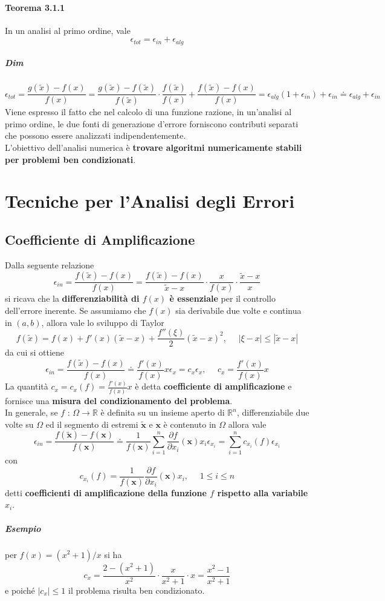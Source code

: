 \documentclass[10pt]{book}
\begin{document}
\paragraph{Teorema 3.1.1} In un analisi al primo ordine, vale $$\epsilon_{tot} = \epsilon_{in} + \epsilon_{alg}$$
\subparagraph{Dim} $$\epsilon_{tot} = \frac{g(\tilde{x}) - f(x)}{f(x)} = \frac{g(\tilde{x}) - f(\tilde{x})}{f(\tilde{x})}\cdot\frac{f(\tilde{x})}{f(x)} + \frac{f(\tilde{x}) - f(x)}{f(x)} = \epsilon_{alg}(1 + \epsilon_{in}) + \epsilon_{in} \doteq \epsilon_{alg} + \epsilon_{in}$$
Viene espresso il fatto che nel calcolo di una funzione razione, in un'analisi al primo ordine, le due fonti di generazione d'errore forniscono contributi separati che possono essere analizzati indipendentemente.\\
L'obiettivo dell'analisi numerica è \textbf{trovare algoritmi numericamente stabili per problemi ben condizionati}.
\section{Tecniche per l'Analisi degli Errori}
\subsection{Coefficiente di Amplificazione}
Dalla seguente relazione $$\epsilon_{in} = \frac{f(\tilde{x}) - f(x)}{f(x)} = \frac{f(\tilde{x}) - f(x)}{\tilde{x} - x}\cdot\frac{x}{f(x)}\cdot\frac{\tilde{x} - x}{x}$$ si ricava che la \textbf{differenziabilità di $f(x)$ è essenziale} per il controllo dell'errore inerente. Se assumiamo che $f(x)$ sia derivabile due volte e continua in $(a, b)$, allora vale lo sviluppo di Taylor $$f(\tilde{x}) = f(x) + f'(x)(\tilde{x} - x) + \frac{f''(\xi)}{2}(\tilde{x} - x)^2,\:\:\:\:\:\:|\xi - x| \leq |\tilde{x} - x| $$ da cui si ottiene $$ \epsilon_{in} = \frac{f(\tilde{x}) - f(x)}{f(x)} \doteq \frac{f'(x)}{f(x)}x\epsilon_x = c_x\epsilon_x,\:\:\:\:\:\:c_x = \frac{f'(x)}{f(x)}x $$
La quantità $c_x = c_x(f) = \frac{f'(x)}{f(x)}x$ è detta \textbf{coefficiente di amplificazione} e fornisce una \textbf{misura del condizionamento del problema}.\\
In generale, se $f$ : $\Omega \rightarrow \mathbb{R}$ è definita su un insieme aperto di $\mathbb{R}^n$, differenziabile due volte su $\Omega$ ed il segmento di estremi $\tilde{\textbf{x}}$ e $\textbf{x}$ è contenuto in $\Omega$ allora vale
$$ \epsilon_{in} = \frac{f(\tilde{\textbf{x}}) - f(\textbf{x})}{f(\textbf{x})} \doteq \frac{1}{f(\textbf{x})}\sum_{i=1}^n \frac{\partial f}{\partial x_i}(\textbf{x})x_i\epsilon_{x_i} = \sum_{i=1}^n c_{x_i}(f)\epsilon_{x_i}$$
con $$c_{x_i}(f) = \frac{1}{f(\textbf{x})}\frac{\partial f}{\partial x_i}(\textbf{x})x_i,\:\:\:\:\:\:1 \leq i \leq n$$
detti \textbf{coefficienti di amplificazione della funzione $f$ rispetto alla variabile $x_i$}.
\subparagraph{Esempio} per $f(x) = (x^2 + 1)/x$ si ha $$c_x = \frac{2 - (x^2 + 1)}{x^2}\cdot \frac{x}{x^2 + 1}\cdot x = \frac{x^2 - 1}{x^2 + 1}$$ e poiché $|c_x| \leq 1$ il problema risulta ben condizionato.
\end{document}
